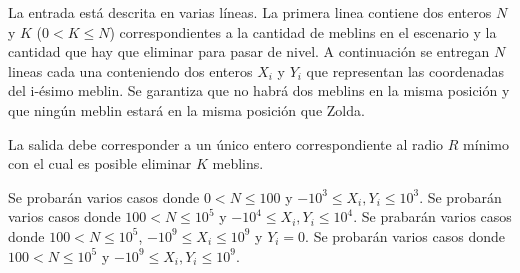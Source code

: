 \documentclass{oci}
\begin{document}
\begin{inputDescription}
  La entrada está descrita en varias líneas.
  La primera linea contiene dos enteros $N$ y $K$ ($0<K\leq N$) correspondientes a la cantidad
  de meblins en el escenario y la cantidad que hay que eliminar para pasar de nivel.
  A continuación se entregan $N$ lineas cada una conteniendo dos enteros $X_i$ y
  $Y_i$ que representan las coordenadas del i-ésimo meblin.
  Se garantiza que no habrá dos meblins en la misma posición y que ningún
  meblin estará en la misma posición que Zolda.
\end{inputDescription}

\begin{outputDescription}
  La salida debe corresponder a un único entero correspondiente al radio $R$
  mínimo con el cual es posible eliminar $K$ meblins.
\end{outputDescription}

\begin{scoreDescription}
 Se probarán varios casos donde $0 < N \leq 100$ y $-10^3 \leq X_i,Y_i  \leq 10^3$.
 Se probarán varios casos donde $100 < N \leq 10^5$ y $-10^4 \leq X_i, Y_i \leq 10^4$.
 Se prabarán varios casos donde $100 < N \leq 10^5$, $-10^9 \leq X_i \leq 10^9$ y $Y_i = 0$.
 Se probarán varios casos donde $100 < N \leq 10^5$ y $-10^9 \leq X_i, Y_i \leq 10^9$.
\end{scoreDescription}

\begin{sampleDescription}
\end{sampleDescription}
\end{document}
